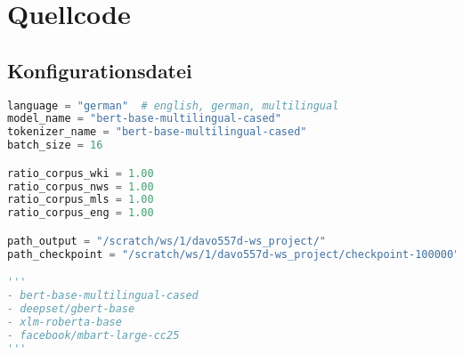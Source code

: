 \chapter*{Quellcode}

\section*{Konfigurationsdatei}
\begin{lstlisting}[language=Python, caption=Konfigurationsdatei]
language = "german"  # english, german, multilingual
model_name = "bert-base-multilingual-cased"
tokenizer_name = "bert-base-multilingual-cased"
batch_size = 16

ratio_corpus_wki = 1.00
ratio_corpus_nws = 1.00
ratio_corpus_mls = 1.00
ratio_corpus_eng = 1.00

path_output = "/scratch/ws/1/davo557d-ws_project/"
path_checkpoint = "/scratch/ws/1/davo557d-ws_project/checkpoint-100000"

'''
- bert-base-multilingual-cased
- deepset/gbert-base
- xlm-roberta-base
- facebook/mbart-large-cc25
'''
\end{lstlisting}
\newpage


